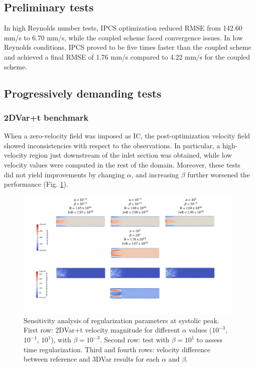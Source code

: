 \subsection*{Preliminary tests}
In high Reynolds number tests, IPCS optimization reduced RMSE from 142.60 mm/s to 6.70 mm/s, while the coupled scheme faced convergence issues. In low Reynolds conditions, IPCS proved to be five times faster than the coupled scheme and achieved a final RMSE of 1.76 mm/s compared to 4.22 mm/s for the coupled scheme.

\subsection*{Progressively demanding tests}
\subsubsection*{2DVar+t benchmark}
When a zero-velocity field was imposed as IC, the post-optimization velocity field showed inconsistencies with respect to the observations.
In particular, a high-velocity region just downstream of the inlet section was obtained, while low velocity values were computed in the rest of the domain.
Moreover, these tests did not yield improvements by changing \(\alpha\), and increasing \(\beta\) further worsened the performance (Fig. \ref{fig:3.3}).

\begin{figure}
    \centering
    \includegraphics[width=\textwidth]{chapters/paratico/Fig1.2.pdf}
    \caption{Sensitivity analysis of regularization parameters at systolic peak. First row: 2DVar+t velocity magnitude for different $\alpha$ values ($10^{-3}$, $10^{-1}$, $10^{1}$), with $\beta = 10^{-3}$. Second row: test with $\beta = 10^{1}$ to assess time regularization. Third and fourth rows: velocity difference between reference and 3DVar results for each $\alpha$ and $\beta$.}
    \label{fig:3.3}
\end{figure}

